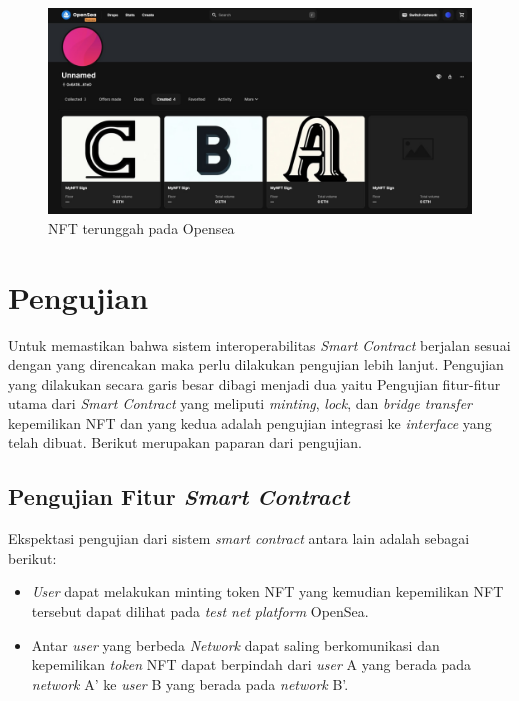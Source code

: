 \begin{figure} [H] \centering
  \includegraphics[scale=0.28]{gambar/opensea.jpeg}
  \caption{NFT terunggah pada Opensea}
  \label{fig:opensea}
\end{figure}

\section{Pengujian}
Untuk memastikan bahwa sistem interoperabilitas \emph{Smart Contract} berjalan sesuai dengan yang direncakan maka perlu dilakukan pengujian lebih lanjut. Pengujian yang dilakukan secara garis besar dibagi menjadi dua yaitu Pengujian fitur-fitur utama dari \emph{Smart Contract} yang meliputi \emph{minting}, \emph{lock}, dan \emph{bridge transfer} kepemilikan NFT dan yang kedua adalah pengujian integrasi ke \emph{interface} yang telah dibuat. Berikut merupakan paparan dari pengujian.

\subsection{Pengujian Fitur \emph{Smart Contract}}
Ekspektasi pengujian dari sistem \emph{smart contract} antara lain adalah sebagai berikut:
\begin{itemize}
    \item \emph{User} dapat melakukan minting token NFT yang kemudian kepemilikan NFT tersebut dapat dilihat pada \emph{test net} \emph{platform} OpenSea.

    \item Antar \emph{user} yang berbeda \emph{Network} dapat saling berkomunikasi dan kepemilikan \emph{token} NFT dapat berpindah dari \emph{user} A yang berada pada \emph{network} A' ke \emph{user} B yang berada pada \emph{network} B'.
\end{itemize}

